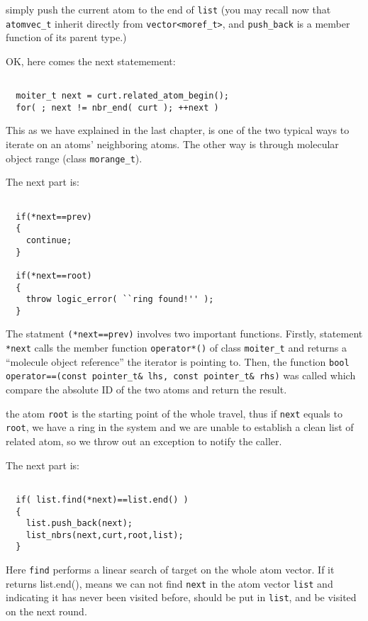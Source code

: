\documentclass[letterpaper]{book}
\begin{document}
simply push the current atom to the end of \lstinline$list$  (you may recall now that \lstinline$atomvec_t$ inherit directly
from \lstinline$vector<moref_t>$, and \lstinline$push_back$ is a member function of its parent type.)

OK, here comes the next statemement:

\begin{lstlisting}

  moiter_t next = curt.related_atom_begin();
  for( ; next != nbr_end( curt ); ++next )

\end{lstlisting}

This as we have explained in the last chapter, is one of the two typical ways to iterate on an atoms' neighboring atoms.
The other way is through molecular object range (class \lstinline$morange_t$).

The next part is:

\begin{lstlisting}

  if(*next==prev)
  {
    continue;
  }

  if(*next==root)
  {
    throw logic_error( ``ring found!'' );
  } 

\end{lstlisting}

The statment \lstinline$(*next==prev)$ involves two important functions. Firstly,
statement \lstinline$*next$ calls the member function \lstinline$operator*()$ of class \lstinline$moiter_t$
and returns a ``molecule object reference'' the iterator is pointing to. Then, the function 
\lstinline$bool operator==(const pointer_t& lhs, const pointer_t& rhs)$ was called 
which compare the absolute ID of the two atoms and return the result.

the atom \lstinline$root$ is the starting point of the whole travel, thus if \lstinline$next$
equals to \lstinline$root$, we have a ring in the system and we are unable to establish a clean list of 
related atom, so we throw out an exception to notify the caller.

The next part is:
\begin{lstlisting}

  if( list.find(*next)==list.end() )
  {
    list.push_back(next);
    list_nbrs(next,curt,root,list);
  }

\end{lstlisting}

Here \lstinline$find$ performs a linear search of target on the whole atom vector. If it 
returns list.end(), means we can not find \lstinline$next$  in the atom vector \lstinline$list$ 
and indicating it has never been visited before, should be put in \lstinline$list$, and be visited
on the next round.
\end{document}
